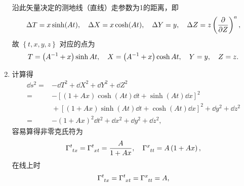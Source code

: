 \begin{xiti}
\begin{zm}
\begin{enumerate}[label=(\alph*)]
\begin{equation*}
\begin{split}
					\end{split}
				\end{equation*}
				沿此矢量决定的测地线（直线）走参数为1的距离，即
				\begin{equation*}
					\Delta T = x \sinh(At) \qc \Delta X = x \cosh(At) \qc \Delta Y = y \qc \Delta Z = z \tensor{\left( \pdv{Z} \right)}{^a},
				\end{equation*}
				故 $\left\{ t,x,y,z \right\}$ 对应的点为
				\begin{equation}
					T=\left( A^{-1} + x \right) \sinh At \qc X= \left( A^{-1} + x \right) \cosh At \qc Y=y \qc Z=z. \label{eq-txyz2TXYZ}
				\end{equation}
				\item 计算得
				\begin{equation*}
					\begin{split}
						\dd{s}^2 ={}& - \dd{T}^2 + \dd{X}^2 + \dd{Y}^2 + \dd{Z}^2\\
						={}& - \left[ \left( 1 + A x \right) \cosh(A t) \dd{t} + \sinh(A t) \dd{x} \right]^2\\
						&{}+ \left[ \left( 1 + A x \right) \sinh(A t) \dd{t} + \cosh(A t) \dd{x} \right]^2 + \dd{y}^2 + \dd{z}^2\\
						={}& - \left( 1+ A x \right)^2 \dd{t}^2 + \dd{x}^2 + \dd{y}^2 + \dd{z}^2,
					\end{split}
				\end{equation*}
				容易算得非零克氏符为
				\begin{equation*}
					\ChristoffelSymbol{t}{t}{x} = \ChristoffelSymbol{t}{x}{t} = \frac{A}{1+A x} \qc \ChristoffelSymbol{x}{t}{t} = A \left( 1+Ax \right),
				\end{equation*}
				在线上时
				\begin{equation*}
					\ChristoffelSymbol{t}{t}{x} = \ChristoffelSymbol{t}{x}{t} =  \ChristoffelSymbol{x}{t}{t} = A,
				\end{equation*}

\end{enumerate}
\end{zm}
\end{xiti}
